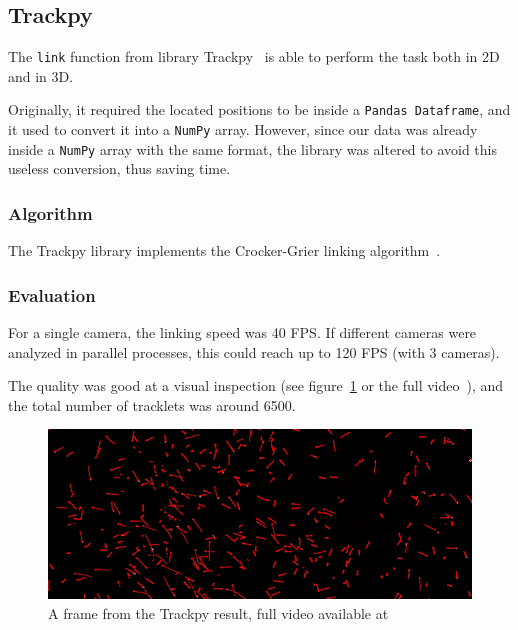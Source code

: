 \subsection{Trackpy}
\label{sec:link2d:trackpy}

The \texttt{link} function from library Trackpy~\cite{trackpy} is able to perform the \link* task both in 2D and in 3D.

Originally, it required the located positions to be inside a \texttt{Pandas Dataframe}, and it used to convert it into a \texttt{NumPy} array.
However, since our data was already inside a \texttt{NumPy} array with the same format, the library was altered to avoid this useless conversion, thus saving time.

\subsubsection{Algorithm}

The Trackpy library implements the Crocker-Grier linking algorithm~\cite{trackpy-link}.

\subsubsection{Evaluation}

For a single camera, the linking speed was 40 FPS.
If different cameras were analyzed in parallel processes, this could reach up to 120 FPS (with 3 cameras).

The quality was good at a visual inspection (see figure~\ref{fig:linkDD:trackpy} or the full video~\cite{linkDD-trackpy}), and the total number of tracklets was around 6500.

\begin{figure}
	\centerline{\includegraphics[width=\locateimgsize]{images/link2d/trackpy.png}}
	\caption{\centering A frame from the Trackpy \linkDD* result, full video available at~\cite{linkDD-trackpy}}
	\label{fig:linkDD:trackpy}
\end{figure}
